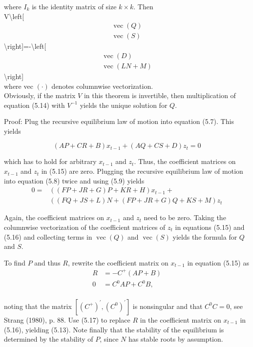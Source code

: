 \documentclass[10pt]{article}
\begin{document}
where $I_{k}$ is the identity matrix of size $k \times k$. Then\\
V\textbackslash left[\[
\begin{array}{l}
\operatorname{vec}(Q)  \tag{5.14}\\
\operatorname{vec}(S)
\end{array}
\]\textbackslash right]=-\textbackslash left[\[
\begin{array}{c}
\operatorname{vec}(D) \\
\operatorname{vec}(L N+M)
\end{array}
\]\textbackslash right]\\
where vec $(\cdot)$ denotes columnwise vectorization.\\
Obviously, if the matrix $V$ in this theorem is invertible, then multiplication of equation (5.14) with $V^{-1}$ yields the unique solution for $Q$.

Proof: Plug the recursive equilibrium law of motion into equation (5.7). This yields

\begin{equation*}
(A P+C R+B) x_{t-1}+(A Q+C S+D) z_{t}=0 \tag{5.15}
\end{equation*}

which has to hold for arbitrary $x_{t-1}$ and $z_{t}$. Thus, the coefficient matrices on $x_{t-1}$ and $z_{t}$ in (5.15) are zero. Plugging the recursive equilibrium law of motion into equation (5.8) twice and using (5.9) yields\\
\begin{align*}
0= & ((F P+J R+G) P+K R+H) x_{t-1}+  \tag{5.16}\\
& ((F Q+J S+L) N+(F P+J R+G) Q+K S+M) z_{t}
\end{align*}

Again, the coefficient matrices on $x_{t-1}$ and $z_{t}$ need to be zero. Taking the columnwise vectorization of the coefficient matrices of $z_{t}$ in equations (5.15) and (5.16) and collecting terms in $\operatorname{vec}(Q)$ and $\operatorname{vec}(S)$ yields the formula for $Q$ and $S$.

To find $P$ and thus $R$, rewrite the coefficient matrix on $x_{t-1}$ in equation (5.15) as\\
\begin{align*}
R & =-C^{+}(A P+B)  \tag{5.17}\\
0 & =C^{0} A P+C^{0} B,
\end{align*}\\
noting that the matrix $\left[\left(C^{+}\right)^{\prime},\left(C^{0}\right)^{\prime}\right]$ is nonsingular and that $C^{0} C=0$, see Strang (1980), p. 88. Use (5.17) to replace $R$ in the coefficient matrix on $x_{t-1}$ in (5.16), yielding (5.13). Note finally that the stability of the equilibrium is determined by the stability of $P$, since $N$ has stable roots by assumption.
\end{document}
